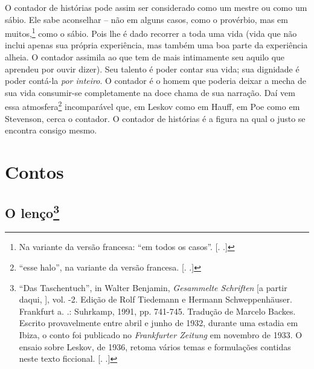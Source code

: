 O contador de histórias pode assim ser considerado como um mestre ou
como um sábio. Ele sabe aconselhar -- não em alguns casos, como o
provérbio, mas em muitos,\footnote{Na variante da versão francesa: ``em
  todos os casos''. [. .]} como o sábio. Pois lhe é dado
recorrer a toda uma vida (vida que não inclui apenas sua própria
experiência, mas também uma boa parte da experiência alheia. O contador
assimila ao que tem de mais intimamente seu aquilo que aprendeu por
ouvir dizer). Seu talento é poder contar sua vida; sua dignidade é poder
contá-la \emph{por inteiro}. O contador é o homem que poderia deixar a
mecha de sua vida consumir-se completamente na doce chama de sua
narração. Daí vem essa atmosfera\footnote{``esse halo'', na variante da
  versão francesa. [. .]} incomparável que, em Leskov como em
Hauff, em Poe como em Stevenson, cerca o contador. O contador de
histórias é a figura na qual o justo se encontra consigo mesmo\label{supra4}.

\part{Contos}

\chapter{O lenço\footnote[*]{``Das Taschentuch'', in Walter Benjamin,
  \emph{Gesammelte Schriften} [a partir daqui, ], vol. -2.
  Edição de Rolf Tiedemann e Hermann Schweppenhäuser. Frankfurt a. .:
  Suhrkamp, 1991, pp. 741-745. Tradução de Marcelo Backes. Escrito
  provavelmente entre abril e junho de 1932, durante uma estadia em
  Ibiza, o conto foi publicado no \emph{Frankfurter Zeitung} em novembro
  de 1933. O ensaio sobre Leskov, de 1936, retoma vários temas e
  formulações contidas neste texto ficcional. [. .]}}

